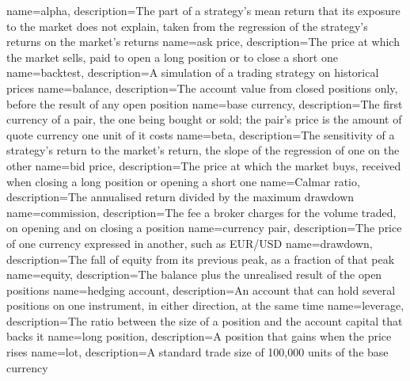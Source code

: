{
    name=alpha,
    description={The part of a strategy's mean return that its exposure to the market does not explain, taken from the regression of the strategy's returns on the market's returns}
}
{
    name=ask price,
    description={The price at which the market sells, paid to open a long position or to close a short one}
}
{
    name=backtest,
    description={A simulation of a trading strategy on historical prices}
}
{
    name=balance,
    description={The account value from closed positions only, before the result of any open position}
}
{
    name=base currency,
    description={The first currency of a pair, the one being bought or sold; the pair's price is the amount of quote currency one unit of it costs}
}
{
    name=beta,
    description={The sensitivity of a strategy's return to the market's return, the slope of the regression of one on the other}
}
{
    name=bid price,
    description={The price at which the market buys, received when closing a long position or opening a short one}
}
{
    name=Calmar ratio,
    description={The annualised return divided by the maximum drawdown}
}
{
    name=commission,
    description={The fee a broker charges for the volume traded, on opening and on closing a position}
}
{
    name=currency pair,
    description={The price of one currency expressed in another, such as EUR/USD}
}
{
    name=drawdown,
    description={The fall of equity from its previous peak, as a fraction of that peak}
}
{
    name=equity,
    description={The balance plus the unrealised result of the open positions}
}
{
    name=hedging account,
    description={An account that can hold several positions on one instrument, in either direction, at the same time}
}
{
    name=leverage,
    description={The ratio between the size of a position and the account capital that backs it}
}
{
    name=long position,
    description={A position that gains when the price rises}
}
{
    name=lot,
    description={A standard trade size of 100,000 units of the base currency}
}
